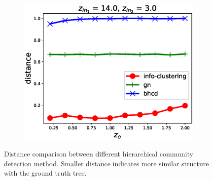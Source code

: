 \begin{figure}
\begin{subfigure}{0.33\textwidth}
		\includegraphics[width=\textwidth]{pic/z_o.eps}
		\caption{}
	\end{subfigure}
	\caption{Distance comparison between different hierarchical community detection method. Smaller distance indicates more similar structure with the ground truth tree.}\label{fig:cdr}	
\end{figure}

